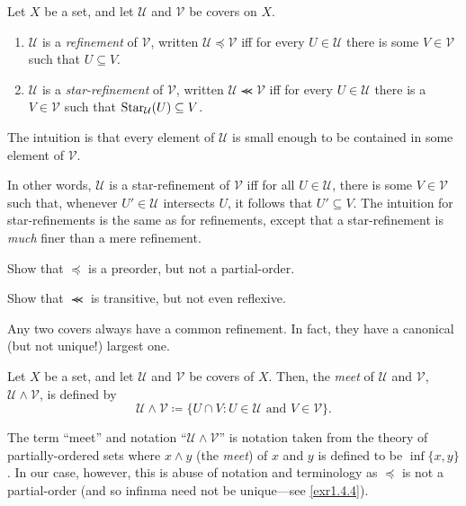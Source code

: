 \begin{dfn}\label{dfnC.1}
Let $X$ be a set, and let $\mathcal{U}$ and $\mathcal{V}$ be covers on $X$.
\begin{enumerate}
\item $\mathcal{U}$ is a \emph{refinement} of $\mathcal{V}$, written $\mathcal{U}\preceq \mathcal{V}$ iff for every $U\in \mathcal{U}$ there is some $V\in \mathcal{V}$ such that $U\subseteq V$.
\item $\mathcal{U}$ is a \emph{star-refinement} of $\mathcal{V}$, written $\mathcal{U}\llcurly \mathcal{V}$ iff for every $U\in \mathcal{U}$ there is a $V\in \mathcal{V}$ such that $\operatorname{Star} _{\mathcal{U}}(U)\subseteq V$.
\end{enumerate}
\begin{rmk}
The intuition is that every element of $\mathcal{U}$ is small enough to be contained in some element of $\mathcal{V}$.
\end{rmk}
\begin{rmk}
In other words, $\mathcal{U}$ is a star-refinement of $\mathcal{V}$ iff for all $U\in \mathcal{U}$, there is some $V\in \mathcal{V}$ such that, whenever $U'\in \mathcal{U}$ intersects $U$, it follows that $U'\subseteq V$.  The intuition for star-refinements is the same as for refinements, except that a star-refinement is \emph{much} finer than a mere refinement.
\end{rmk}
\end{dfn}
\begin{exr}
Show that $\preceq$ is a preorder, but not a partial-order.
\end{exr}
\begin{exr}\label{exr4.2.22}
Show that $\llcurly$ is transitive, but not even reflexive.
\end{exr}
Any two covers always have a common refinement.  In fact, they have a canonical (but not unique!) largest one.
\begin{dfn}
Let $X$ be a set, and let $\mathcal{U}$ and $\mathcal{V}$ be covers of $X$.  Then, the \emph{meet} of $\mathcal{U}$ and $\mathcal{V}$, $\mathcal{U}\wedge \mathcal{V}$, is defined by
\begin{equation}
\mathcal{U}\wedge \mathcal{V}\coloneqq \{ U\cap V:U\in \mathcal{U}\text{ and }V\in \mathcal{V}\} .
\end{equation}
\begin{rmk}
The term ``meet'' and notation ``$\mathcal{U}\wedge \mathcal{V}$'' is notation taken from the theory of partially-ordered sets where $x\wedge y$ (the \emph{meet}) of $x$ and $y$ is defined to be $\inf \{ x,y\}$.  In our case, however, this is abuse of notation and terminology as $\preceq$ is not a partial-order (and so infinma need not be unique---see \cref{exr1.4.4}).
\end{rmk}
\end{dfn}
